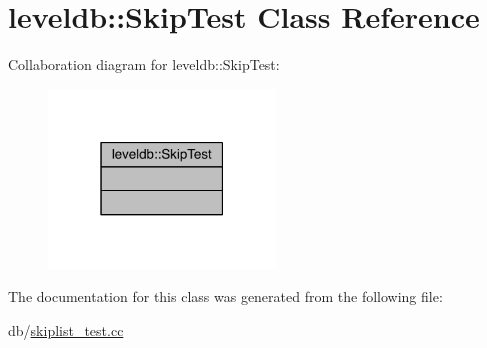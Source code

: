 \hypertarget{classleveldb_1_1_skip_test}{}\section{leveldb\+:\+:Skip\+Test Class Reference}
\label{classleveldb_1_1_skip_test}


Collaboration diagram for leveldb\+:\+:Skip\+Test\+:\nopagebreak
\begin{figure}[H]
\begin{center}
\leavevmode
\includegraphics[width=171pt]{classleveldb_1_1_skip_test__coll__graph}
\end{center}
\end{figure}


The documentation for this class was generated from the following file\+:\begin{DoxyCompactItemize}
\item 
db/\hyperlink{skiplist__test_8cc}{skiplist\+\_\+test.\+cc}\end{DoxyCompactItemize}
